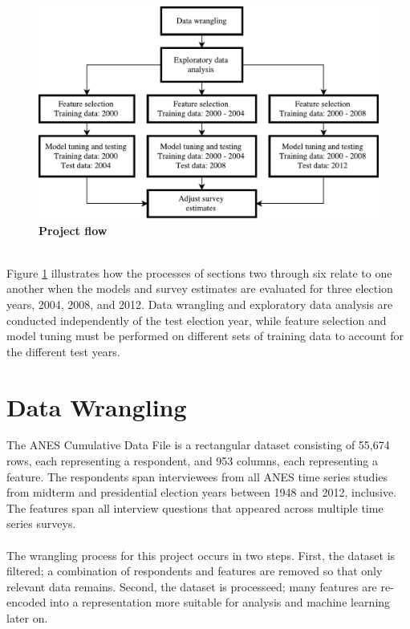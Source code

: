\documentclass{article}
\begin{document}
	\begin{figure}[h!]
		\includegraphics*[width=\linewidth]{project_flow}
		\caption{\textbf{Project flow}}
		\label{fig:project_flow}
	\end{figure}
	\hfill\\
	Figure \ref{fig:project_flow} illustrates how the processes of sections two through six relate to one another when the models and survey estimates are evaluated for three election years, 2004, 2008, and 2012. Data wrangling and exploratory data analysis are conducted independently of the test election year, while feature selection and model tuning must 
	be performed on different sets of training data to account for the different test years.
	
	\section{Data Wrangling}
	
	The ANES Cumulative Data File is a rectangular dataset consisting of 55,674 rows, each representing a respondent, and 953 columns, each representing a feature. The respondents span interviewees from all ANES time series studies from midterm and presidential election years between 1948 and 2012, inclusive. The features span all interview questions that appeared across multiple time series surveys.
	\\\\
	The wrangling process for this project occurs in two steps. First, the dataset is filtered; a combination of respondents and features are removed so that only relevant data remains. Second, the dataset is processeed; many features are re-encoded into a representation more suitable for analysis and machine learning later on.
	
\end{document}
